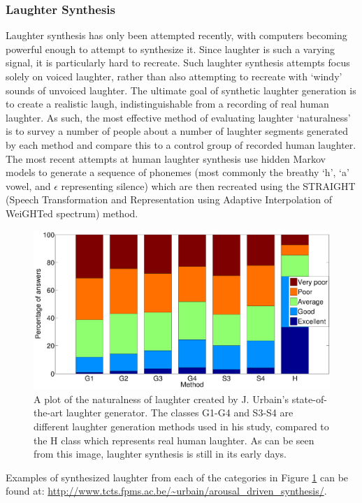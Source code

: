 \documentclass[a4paper,11pt,notitlepage]{article}
\begin{document}
\subsubsection{Laughter Synthesis}
Laughter synthesis has only been attempted recently, with computers becoming powerful enough to attempt to synthesize it. Since laughter is such a varying signal, it is particularly hard to recreate. Such laughter synthesis attempts focus solely on voiced laughter, rather than also attempting to recreate with `windy' sounds of unvoiced laughter. The ultimate goal of synthetic laughter generation is to create a realistic laugh, indistinguishable from a recording of real human laughter. As such, the most effective method of evaluating laughter `naturalness' is to survey a number of people about a number of laughter segments generated by each method and compare this to a control group of recorded human laughter. The most recent attempts at human laughter synthesis use hidden Markov models to generate a sequence of phonemes (most commonly the breathy `h', `a' vowel, and $\epsilon$ representing silence) which are then recreated using the STRAIGHT (Speech Transformation and Representation using Adaptive Interpolation of WeiGHTed spectrum) method.\cite{kawahara1999restructuring,dupont2014acoustic}
\begin{figure}[H]
	\centering
	\vspace{0.5cm}
	\includegraphics[scale = 0.35]{figs/laughter_naturalness.png}
	\caption{A plot of the naturalness of laughter created by J. Urbain's state-of-the-art laughter generator. The classes G1-G4 and S3-S4 are different laughter generation methods used in his study, compared to the H class which represents real human laughter. As can be seen from this image, laughter synthesis is still in its early days.}
	\label{laughter_synthesis_naturalness}
\end{figure}
Examples of synthesized laughter from each of the categories in Figure \ref{laughter_synthesis_naturalness} can be found at: \url{http://www.tcts.fpms.ac.be/~urbain/arousal_driven_synthesis/}.\cite{dupont2014acoustic}
\end{document}
